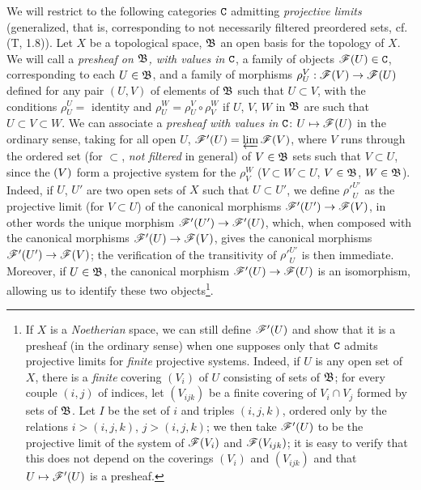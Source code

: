\begin{env}[3.2.1]
\label{0.3.2.1}
We will restrict to the following categories $\mathtt{C}$ admitting \emph{projective
limits} (generalized, that is, corresponding to not necessarily filtered
preordered sets, cf. (T, 1.8)). Let $X$ be a topological space, $\mathfrak{B}$
an open basis for the topology of $X$. We will call a \emph{presheaf on
$\mathfrak{B}$, with values in $\mathtt{C}$}, a family of objects $\mathscr{F}(U)\in\mathtt{C}$,
corresponding to each $U\in\mathfrak{B}$, and a family of morphisms $\rho_U^V:\sh{F}(V)\to\sh{F}(U)$ defined for any pair $(U,V)$ of elements of
$\mathfrak{B}$ such that $U\subset V$,
with the conditions $\rho_U^U=$ identity and $\rho_U^W=\rho_U^V\circ\rho_V^W$ if
$U$, $V$, $W$ in $\mathfrak{B}$ are such that $U\subset V\subset W$. We can
associate a \emph{presheaf with values in $\mathtt{C}$}: $U\mapsto\sh{F}(U)$ in the
ordinary sense, taking for all open $U$, $\mathscr{F}'(U)=\varprojlim\mathscr{F}(V)$,
where $V$ runs through the ordered set (for $\subset$, \emph{not filtered} in
general) of $V\in\mathfrak{B}$ sets such that $V\subset U$, since the $\mathscr(V)$
form a projective system for the $\rho_V^W$ ($V\subset W\subset U$,
$V\in\mathfrak{B}$, $W\in\mathfrak{B}$). Indeed, if $U$, $U'$ are two open sets
of $X$ such that $U\subset U'$, we define ${\rho'}_U^{U'}$ as the projective
limit (for $V\subset U$) of the canonical morphisms $\sh{F}'(U')\to\sh{F}(V)$,
in other words the unique morphism $\sh{F}'(U')\to\sh{F}'(U)$, which, when
composed with the canonical morphisms $\sh{F}'(U)\to\sh{F}(V)$, gives the
canonical morphisms $\sh{F}'(U')\to\sh{F}(V)$; the verification of the
transitivity of ${\rho'}_U^{U'}$ is then immediate. Moreover, if
$U\in\mathfrak{B}$, the canonical morphism $\sh{F}'(U)\to\sh{F}(U)$ is an
isomorphism, allowing us to identify these two objects\footnote{If $X$ is a
\emph{Noetherian} space, we can still define $\mathscr{F}'(U)$ and show that it is a
presheaf (in the ordinary sense) when one supposes only that $\mathtt{C}$ admits
projective limits for \emph{finite} projective systems. Indeed, if $U$ is any
open set of $X$, there is a \emph{finite} covering $(V_i)$ of $U$ consisting of
sets of $\mathfrak{B}$; for every couple $(i,j)$ of indices, let $(V_{ijk})$ be
a finite covering of $V_i\cap V_j$ formed by sets of $\mathfrak{B}$. Let $I$ be
the set of $i$ and triples $(i,j,k)$, ordered only by the relations $i>(i,j,k)$,
$j>(i,j,k)$; we then take $\mathscr{F}'(U)$ to be the projective limit of the system
of $\mathscr{F}(V_i)$ and $\mathscr{F}(V_{ijk})$; it is easy to verify that this does not
depend on the coverings $(V_i)$ and $(V_{ijk})$ and that $U\mapsto\sh{F}'(U)$ is
a presheaf.}.
\end{env}

